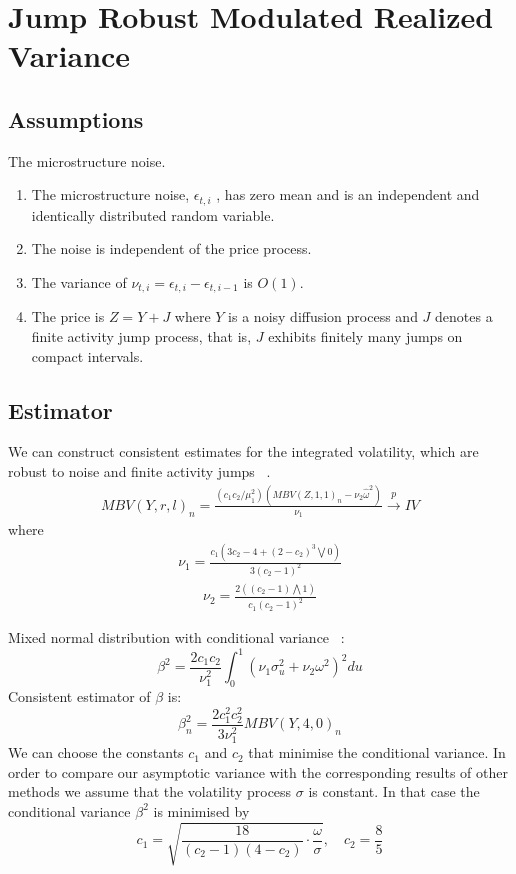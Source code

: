 \documentclass[letterpaper]{report}
\begin{document}
\section{Jump Robust Modulated Realized Variance}
\subsection{Assumptions}
The microstructure noise.
\begin{enumerate}
\item The microstructure noise, $\epsilon_{t,i}$ , has zero mean and is an
independent and identically distributed random variable.
\item The noise is independent of the price process.
\item The variance of $\nu_{t,i} = \epsilon_{t,i} - \epsilon_{t,i-1}$ is
$O(1)$.
\item The price is $Z = Y + J$ where $Y$ is a noisy diffusion process and $J$ denotes a finite activity jump
process, that is, $J$ exhibits finitely many jumps on compact intervals.
\end{enumerate}
\subsection{Estimator}
We can construct consistent estimates for the integrated volatility, which are robust to noise and finite activity jumps
~\cite[Podolskij and Vetter, 2009]{Podolskij_Vetter}.
\begin{gather}
MBV(Y,r,l)_n =\frac{(c_1 c_2/\mu_1^2)(MBV(Z,1,1)_n-\nu_2\hat{\omega}^2)}{\nu_1} \stackrel{p}{\to} IV
\end{gather}
where
\begin{gather}
\nu_1 = \frac{c_1(3c_2-4+(2-c_2)^3\bigvee 0)}{3(c_2-1)^2}
\end{gather}
\begin{gather}
\nu_2 = \frac{2((c_2-1)\bigwedge 1)}{c_1(c_2-1)^2}
\end{gather}

Mixed normal distribution with conditional variance ~\cite[Podolskij and Vetter, 2009]{Podolskij_Vetter}:
\begin{equation}
\beta^2 = \frac{2c_1 c_2}{\nu^2_1}\int_0^1(\nu_1\sigma_u^2+\nu_2\omega^2)^2du
\end{equation}
Consistent estimator of $\beta$ is:
\begin{equation}
\beta^2_n = \frac{2c_1^2 c_2^2}{3\nu^2_1}MBV(Y,4,0)_n
\end{equation}
We can choose the constants $c_1$ and
$c_2$ that minimise the conditional variance. In order to compare our asymptotic variance
with the corresponding results of other methods we assume that the volatility process $\sigma$
is constant. In that case the conditional variance $\beta^2$ is minimised by
\begin{equation}
c_1 = \sqrt{\frac{18}{(c_2-1)(4-c_2)}\cdot\frac{\omega}{\sigma}}, \quad
c_2 = \frac{8}{5}
\end{equation}
\end{document}
